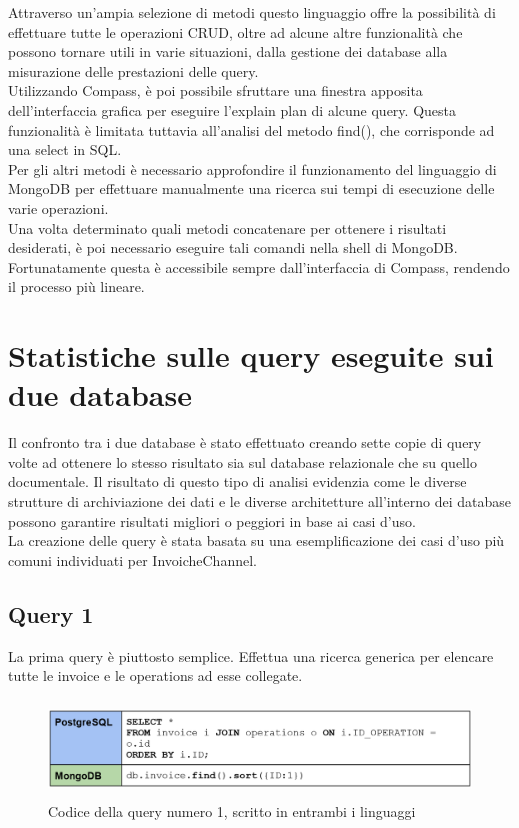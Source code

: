 \noindent Attraverso un'ampia selezione di metodi questo linguaggio offre la possibilità di effettuare tutte le operazioni CRUD, oltre ad alcune altre funzionalità che possono tornare utili in varie situazioni, dalla gestione dei database alla misurazione delle prestazioni delle query.\\
Utilizzando Compass, è poi possibile sfruttare una finestra apposita dell'interfaccia grafica per eseguire l'explain plan di alcune query. Questa funzionalità è limitata tuttavia all'analisi del metodo find(), che corrisponde ad una select in SQL.\\
Per gli altri metodi è necessario approfondire il funzionamento del linguaggio di MongoDB per effettuare manualmente una ricerca sui tempi di esecuzione delle varie operazioni.\\
Una volta determinato quali metodi concatenare per ottenere i risultati desiderati, è poi necessario eseguire tali comandi nella shell di MongoDB. Fortunatamente questa è accessibile sempre dall'interfaccia di Compass, rendendo il processo più lineare.\\


\section{Statistiche sulle query eseguite sui due database}
Il confronto tra i due database è stato effettuato creando sette copie di query volte ad ottenere lo stesso risultato sia sul database relazionale che su quello documentale. Il risultato di questo tipo di analisi evidenzia come le diverse strutture di archiviazione dei dati e le diverse architetture all'interno dei database possono garantire risultati migliori o peggiori in base ai casi d'uso.\\
La creazione delle query è stata basata su una esemplificazione dei casi d'uso più comuni individuati per InvoicheChannel.

\subsection{Query 1}
La prima query è piuttosto semplice. Effettua una ricerca generica per elencare tutte le invoice e le operations ad esse collegate.\\

\begin{figure}[htbp]
\begin{center}
\includegraphics[height=7em]{immagini/query/query1.png}
\caption{Codice della query numero 1, scritto in entrambi i linguaggi}
\end{center}
\end{figure}

